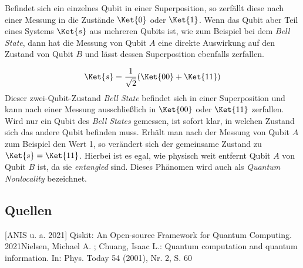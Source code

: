 Befindet sich ein einzelnes Qubit in einer Superposition, so zerfällt diese nach einer Messung in die Zustände \(\Ket{0}\) oder \(\Ket{1}\). Wenn das Qubit aber Teil eines Systems \(\Ket{s}\) aus mehreren Qubits ist, wie zum Beispiel bei dem \textit{Bell State}, dann hat die Messung von Qubit \(A\) eine direkte Auswirkung auf den Zustand von Qubit \(B\) und lässt dessen Superposition ebenfalls zerfallen.

\begin{equation}
    \Ket{s} = \frac{1}{\sqrt{2}} (\Ket{00} + \Ket{11})
\end{equation}
Dieser zwei-Qubit-Zustand \textit{Bell State} befindet sich in einer Superposition und kann nach einer Messung ausschließlich in \(\Ket{00}\) oder \(\Ket{11}\) zerfallen. Wird nur ein Qubit des \textit{Bell States} gemessen, ist sofort klar, in welchen Zustand sich das andere Qubit befinden muss. Erhält man nach der Messung von Qubit \(A\) zum Beispiel den Wert 1, so verändert sich der gemeinsame Zustand zu \(\Ket{s} = \Ket{11}\). \newline
Hierbei ist es egal, wie physisch weit entfernt Qubit \(A\) von Qubit \(B\) ist, da sie \textit{entangled} sind. Dieses Phänomen wird auch als \textit{Quantum Nonlocality} bezeichnet.


\newline \newline
{}





\newline \newline

\subsection{Quellen}
[ANIS u. a. 2021] Qiskit: An Open-source Framework for Quantum Computing. 2021 Nielsen, Michael A. ; Chuang, Isaac L.: Quantum computation and quantum information. In: Phys. Today 54 (2001), Nr. 2, S. 60\newline
